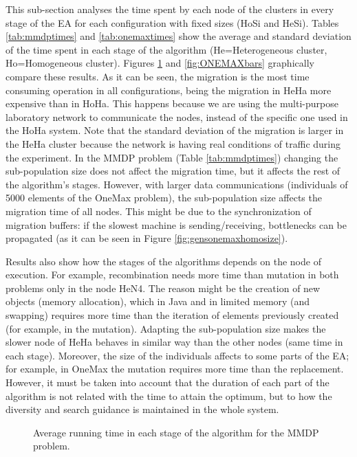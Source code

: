 \documentclass[final,1p,times]{elsarticle}
\begin{document}
This sub-section analyses the time spent by each node of the clusters in every stage of the EA for each configuration with fixed sizes (HoSi and HeSi). Tables \ref{tab:mmdptimes} and \ref{tab:onemaxtimes} show the average and standard deviation of the time spent in each stage of the algorithm (He=Heterogeneous cluster, Ho=Homogeneous cluster). Figures \ref{fig:MMDPbars} and \ref{fig:ONEMAXbars} graphically compare these results. As it can be seen, the migration is the most time consuming operation in all configurations, being the migration in HeHa more expensive than in HoHa. This happens because we are using the multi-purpose laboratory network to communicate the nodes, instead of the specific one used in the HoHa system. Note that the standard deviation of the migration is larger in the HeHa cluster because the network is having real conditions of traffic during the experiment. In the MMDP problem (Table \ref{tab:mmdptimes}) changing the sub-population size does not affect the migration time, but it affects the rest of the algorithm's stages. However, with larger data communications (individuals of 5000 elements of the OneMax problem), the sub-population size affects the migration time of all nodes. This might be due to the synchronization of migration buffers: if the slowest machine is sending/receiving, bottlenecks can be propagated (as it can be seen in Figure \ref{fig:gensonemaxhomosize}). 

Results also show how the stages of the algorithms depends on the node
of execution. For example, recombination needs more time than mutation
in both problems only in the node HeN4. The reason might be the
creation of new objects (memory allocation), which in Java and in
limited memory (and swapping) requires more time than the iteration of
elements previously created (for example, in the mutation). Adapting
the sub-population size makes the slower node of HeHa behaves in similar
way than the other nodes (same time in each stage). Moreover, the size
of the individuals affects to some parts of the EA; for example, in 
OneMax the mutation requires more time than the replacement. However,
it must be taken into account that the duration of each part of the
algorithm is not related with the time to attain the optimum, but to
how the diversity and search guidance is maintained in the whole system.  

\begin{figure}[htb]
\centering
{}
\caption{Average running time in each stage of the algorithm for the MMDP problem.}
\label{fig:MMDPbars}
\end{figure}
\end{document}
